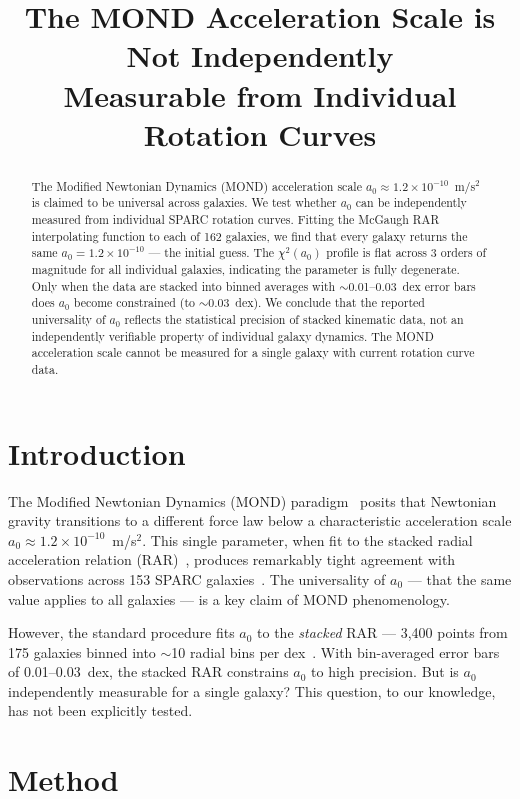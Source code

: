 \documentclass[twocolumn]{aastex631}
\begin{document}
\title{The MOND Acceleration Scale is Not Independently\\[-3pt]
Measurable from Individual Rotation Curves}

\author{}

\begin{abstract}
The Modified Newtonian Dynamics (MOND) acceleration scale $a_0 \approx
1.2\times10^{-10}$~m/s$^2$ is claimed to be universal across galaxies.
We test whether $a_0$ can be independently measured from individual
SPARC rotation curves.  Fitting the McGaugh RAR interpolating function
to each of 162 galaxies, we find that every galaxy returns the same
$a_0 = 1.2\times10^{-10}$ --- the initial guess.  The $\chi^2(a_0)$
profile is flat across 3 orders of magnitude for all individual galaxies,
indicating the parameter is fully degenerate.  Only when the data are
stacked into binned averages with $\sim$0.01--0.03~dex error bars does
$a_0$ become constrained (to $\sim$0.03~dex).  We conclude that the
reported universality of $a_0$ reflects the statistical precision of
stacked kinematic data, not an independently verifiable property of
individual galaxy dynamics.  The MOND acceleration scale cannot be
measured for a single galaxy with current rotation curve data.
\end{abstract}

\section{Introduction}

The Modified Newtonian Dynamics (MOND) paradigm~\cite{milgrom1983}
posits that Newtonian gravity transitions to a different force law
below a characteristic acceleration scale $a_0 \approx 1.2 \times
10^{-10}$~m/s$^2$.  This single parameter, when fit to the stacked
radial acceleration relation (RAR)~\cite{mcgaugh2016}, produces
remarkably tight agreement with observations across 153 SPARC
galaxies~\cite{lelli2016}.  The universality of $a_0$ --- that the same
value applies to all galaxies --- is a key claim of MOND phenomenology.

However, the standard procedure fits $a_0$ to the \emph{stacked} RAR ---
3,400 points from 175 galaxies binned into $\sim$10 radial bins per
dex~\cite{lelli2017}.  With bin-averaged error bars of 0.01--0.03~dex,
the stacked RAR constrains $a_0$ to high precision.  But is $a_0$
independently measurable for a single galaxy?  This question, to our
knowledge, has not been explicitly tested.

\section{Method}
\end{document}
